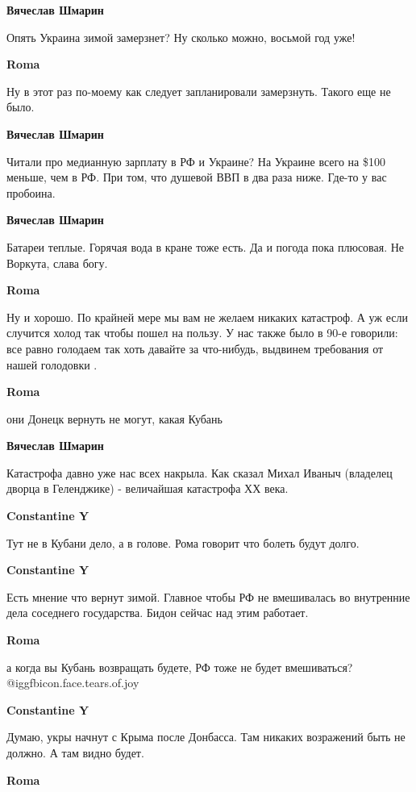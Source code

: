 \begin{itemize}
\textbf{Вячеслав Шмарин}

Опять Украина зимой замерзнет? Ну сколько можно, восьмой год уже!

\textbf{Roma}

Ну в этот раз по-моему как следует запланировали замерзнуть. Такого еще не было.

\textbf{Вячеслав Шмарин}

Читали про медианную зарплату в РФ и Украине? На Украине всего на \$100  меньше,
чем в РФ. При том, что душевой ВВП в два раза ниже. Где-то у вас пробоина.

\textbf{Вячеслав Шмарин}

Батареи теплые. Горячая вода в кране тоже есть. Да и погода пока плюсовая. Не
Воркута, слава богу.

\textbf{Roma}

Ну и хорошо. По крайней мере мы вам не желаем никаких катастроф. А уж если
случится холод так чтобы пошел на пользу. У нас также было в 90-е говорили: все
равно голодаем так хоть давайте за что-нибудь, выдвинем требования от нашей
голодовки .

\textbf{Roma}

они Донецк вернуть не могут, какая Кубань

\textbf{Вячеслав Шмарин}

Катастрофа давно уже нас всех накрыла. Как сказал Михал Иваныч (владелец дворца
в Геленджике) - величайшая катастрофа ХХ века.

\textbf{Constantine Y}

Тут не в Кубани дело, а в голове. Рома говорит что болеть будут долго.

\textbf{Constantine Y}

Есть мнение что вернут зимой. Главное чтобы РФ не вмешивалась во внутренние
дела соседнего государства. Бидон сейчас над этим работает.

\textbf{Roma}

а когда вы Кубань возвращать будете, РФ тоже не будет вмешиваться?   @igg{fbicon.face.tears.of.joy} 

\textbf{Constantine Y}

Думаю, укры начнут с Крыма после Донбасса. Там никаких возражений быть не
должно. А там видно будет.

\textbf{Roma}


\end{itemize}
